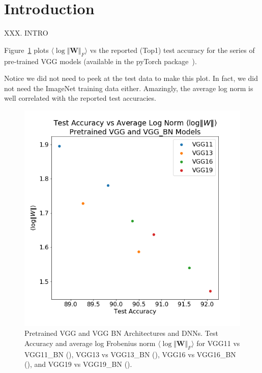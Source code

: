 
\section{Introduction}
\label{sxn:intro}

XXX.  INTRO

Figure~\ref{fig:vgg_lognorms} plots $\langle\log\Vert\mathbf{W}\Vert_{F}\rangle$ vs the reported (Top1) test accuracy for the series of pre-trained VGG models (available in the pyTorch package~\cite{pyTorch}). 

Notice we did not need to peek at the test data to make this plot.  
In fact, we did not need the ImageNet training data either.  
Amazingly, the average log norm is well correlated with the reported test accuracies.

\begin{figure}[!htb]
 \centering
   \includegraphics[scale=0.40]{img/vgg-lognorms.png}
   \caption{
Pretrained VGG and VGG BN Architectures and DNNs.  Test Accuracy and average log Frobenius norm $\langle\log\Vert\mathbf{W}\Vert_{F}\rangle$ for
 VGG11 vs VGG11\_BN ({\color{blue}{blue}}),
VGG13 vs VGG13\_BN ({\color{orange}{orange}}),
VGG16 vs VGG16\_BN ({\color{green}{green}}),  and
VGG19 vs VGG19\_BN ({\color{red}{red}}). 
}
  \label{fig:vgg_lognorms}
\end{figure}

